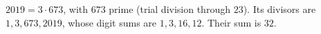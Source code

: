 $2019=3\cdot673$, with $673$ prime (trial division through $23$). Its divisors are $1,3,673,2019$, whose digit sums are $1,3,16,12$. Their sum is $\boxed{32}$.
